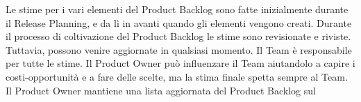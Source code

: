 Le stime per i vari elementi del Product Backlog sono fatte inizialmente durante il Release Planning, e da l\`i in avanti quando gli elementi vengono creati. Durante il processo di coltivazione del Product Backlog le stime sono revisionate e riviste. Tuttavia, possono venire aggiornate in qualsiasi momento. Il Team \`e responsabile per tutte le stime. Il Product Owner pu\`o influenzare il Team aiutandolo a capire i costi-opportunit\`a e a fare delle scelte, ma la stima finale spetta sempre al Team. Il Product Owner mantiene una lista aggiornata del Product Backlog sul 

\tip{}

\tip{}
  
\subsection*{\color{Blue}{SPRINT BACKLOG E SPRINT BURNDOWN}}
\label{sec:sprintbacklog}

\subsection*{\color{Blue}{FATTO}}
\label{sec:done}
